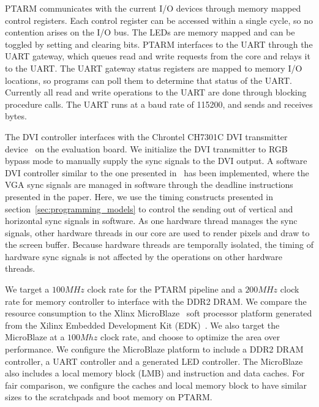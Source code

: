 PTARM communicates with the current I/O devices through memory mapped control registers.
Each control register can be accessed within a single cycle, so no contention arises on the I/O bus.  
The LEDs are memory mapped and can be toggled by setting and clearing bits.
PTARM interfaces to the UART through the UART gateway, which queues read and write requests from the core and relays it to the UART.
The UART gateway status registers are mapped to memory I/O locations, so programs can poll them to determine that status of the UART.  
Currently all read and write operations to the UART are done through blocking procedure calls. 
The UART runs at a baud rate of 115200, and sends and receives bytes.

The DVI controller interfaces with the Chrontel CH7301C DVI transmitter device~\cite{chrontel-dvi} on the evaluation board. 
We initialize the DVI transmitter to RGB bypass mode to manually supply the sync signals to the DVI output.   
A software DVI controller similar to the one presented in~\cite{ip2006processor} has been implemented, where the VGA sync signals are managed in software through the deadline instructions presented in the paper.
Here, we use the timing constructs presented in section~\ref{sec:programming_models} to control the sending out of vertical and horizontal sync signals in software.
As one hardware thread manages the sync signals, other hardware threads in our core are used to render pixels and draw to the screen buffer.  
Because hardware threads are temporally isolated, the timing of hardware sync signals is not affected by the operations on other hardware threads.

We target a $100MHz$ clock rate for the PTARM pipeline and a $200MHz$ clock rate for memory controller to interface with the DDR2 DRAM.
We compare the resource consumption to the Xlinx MicroBlaze~\cite{xilinx-microblaze} soft processor platform generated from the Xilinx Embedded Development Kit (EDK)~\cite{xilinx-edk}.
We also target the MicroBlaze at a $100Mhz$ clock rate, and choose to optimize the area over performance.
We configure the MicroBlaze platform to include a DDR2 DRAM controller, a UART controller and a generated LED controller. 
The MicroBlaze also includes a local memory block (LMB) and instruction and data caches. 
For fair comparison, we configure the caches and local memory block to have similar sizes to the scratchpads and boot memory on PTARM.       

